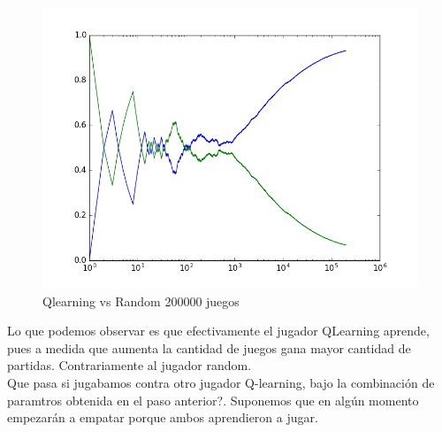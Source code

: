 \begin{figure}[h]
 \centering
  \begin{minipage}[c]{1\textwidth}
	\centering	
	\includegraphics[scale=0.5]{img/QlearningRandomEgreedy200000.png}
        \caption{Qlearning vs Random 200000 juegos}
  \end{minipage}
\end{figure}

Lo que podemos observar es que efectivamente el jugador QLearning aprende, pues a medida que aumenta la cantidad de juegos gana mayor cantidad de partidas. Contrariamente al jugador random.  \\

Que pasa si jugabamos contra otro jugador Q-learning, bajo la combinación de paramtros obtenida en el paso anterior?. Suponemos que en algún momento empezarán a empatar porque ambos aprendieron a jugar.\\

